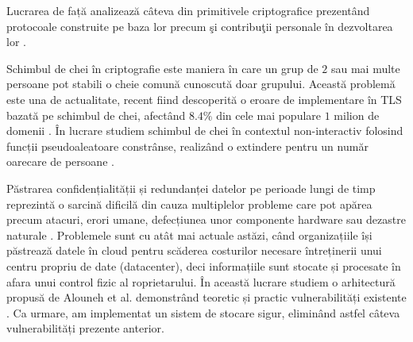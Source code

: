 \documentclass[oneside, 12pt]{book}
\begin{document}
\hspace*{5mm}Lucrarea de față analizează câteva din primitivele criptografice prezentând protocoale construite pe baza lor precum şi contribuţii personale în dezvoltarea lor \cite{RD:2014, RD:2015}.

\hspace*{5mm}Schimbul de chei în criptografie este maniera în care un grup de $2$ sau mai multe persoane pot stabili o cheie comună cunoscută doar grupului. Această problemă este una de actualitate, recent fiind descoperită o eroare de implementare în TLS bazată pe schimbul de chei, afectând $8.4 \%$ din cele mai populare $1$ milion de domenii \cite{adrianimperfect:2015}. În lucrare studiem schimbul de chei în contextul non-interactiv folosind funcții pseudoaleatoare constrânse, realizând o extindere pentru un număr oarecare de persoane \cite{RD:2014}.

\hspace*{5mm}Păstrarea confidențialității și redundanței datelor pe perioade lungi de timp reprezintă o sarcină dificilă din cauza multiplelor probleme care pot apărea precum atacuri, erori umane, defecțiunea unor componente hardware sau dezastre naturale \cite{SGMV:2009}. Problemele sunt cu atât mai actuale astăzi, când organizațiile își păstrează datele în cloud pentru scăderea costurilor necesare întreținerii unui centru propriu de date (datacenter), deci informațiile sunt stocate și procesate în afara unui control fizic al roprietarului. În această lucrare studiem o arhitectură propusă de Alouneh et al. demonstrând teoretic și practic vulnerabilități existente \cite{RD:2015}. Ca urmare, am implementat un sistem de stocare sigur, eliminând astfel câteva vulnerabilități prezente anterior.

\end{document}
